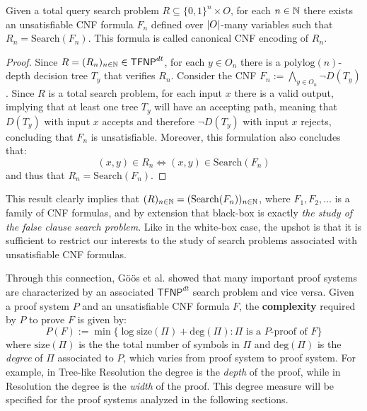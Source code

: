 \begin{proposition}
    \label{Rdt = Search(F)}
 Given a total query search problem $R \subseteq \{0,1\}^n \times O$, for each $n \in \mathbb{N}$ there exists an unsatisfiable CNF formula $F_n$ defined over $\left|O\right|$-many variables such that $R_n = \mathrm{Search}(F_n)$. This formula is called canonical CNF encoding of $R_n$.
\end{proposition}

\begin{proof}
 Since $R = (R_n)_{n \in \mathbb{N}} \in \textsf{TFNP}^{dt}$, for each $y \in O_n$ there is a $\mathrm{polylog}(n)$-depth decision tree $T_y$ that verifies $R_n$. Consider the CNF $F_n := \bigwedge\limits_{y \in O_n} \lnot{D(T_y)}$. Since $R$ is a total search problem, for each input $x$ there is a valid output, implying that at least one tree $T_y$ will have an accepting path, meaning that $D(T_y)$ with input $x$ accepts and therefore $\lnot{D(T_y)}$ with input $x$ rejects, concluding that $F_n$ is unsatisfiable. Moreover, this formulation also concludes that:
    \[(x,y) \in R_n \iff (x,y) \in \mathrm{Search}(F_n)\]
 and thus that $R_n = \mathrm{Search}(F_n)$.

\end{proof}

This result clearly implies that $(R)_{n \in \mathbb{N}} = (\mathrm{Search}(F_n))_{n \in \mathbb{N}}$, where $F_1, F_2, \ldots$ is a family of CNF formulas, and by extension that black-box \TFNP is exactly \textit{the study of the false clause search problem}. Like in the white-box case, the upshot is that it is sufficient to restrict our interests to the study of search problems associated with unsatisfiable CNF formulas.

\newpage

Through this connection, Göös et al. \cite{adventures_monotone_tfnp} showed that many important proof systems are characterized by an associated $\mathsf{TFNP}^{dt}$ search problem and vice versa. Given a proof system $P$ and an unsatisfiable CNF formula $F$, the \textbf{complexity} required by $P$ to prove $F$ is given by:
\[P(F) := \min\{\log \mathrm{size}(\Pi) + \mathrm{deg}(\Pi) : \Pi \text{ is a $P$-proof of } F\}\]
where $\mathrm{size}(\Pi)$ is the the total number of symbols in $\Pi$ and $\mathrm{deg}(\Pi)$ is the \textit{degree} of $\Pi$ associated to $P$, which varies from proof system to proof system. For example, in Tree-like Resolution the degree is the \textit{depth} of the proof, while in Resolution the degree is the \textit{width} of the proof. This degree measure will be specified for the proof systems analyzed in the following sections.

